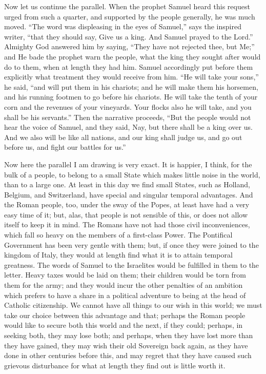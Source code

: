 Now let us continue the parallel. When the prophet
Samuel heard this request urged from such a quarter, and
supported by the people generally, he was much moved.
``The word was displeasing in the eyes of
Samuel,'' says the inspired writer, ``that they
should say, Give us a king. And Samuel prayed to the
Lord.'' Almighty God answered him by saying,
``They have not rejected thee, but Me;'' and He
bade the prophet warn the people, what the king they
sought after would do to them, when at length they had
him. Samuel accordingly put before them explicitly what
treatment they would receive from him. ``He will take
your sons,'' he said, ``and will put them in his
chariots; and he will make them his horsemen, and his
running footmen to go before his chariots. He will take
the tenth of your corn and the revenues of your
vineyards. Your flocks also he will take, and you shall
be his servants.'' Then the narrative proceeds,
``But the people would not hear the voice of Samuel,
and they said, Nay, but there shall be a king over us.
And we also will be like all nations, and our king shall
judge us, and go out before us, and fight our battles for
us.''

Now here the parallel I am drawing is very exact. It
is happier, I think, for the bulk of a people, to belong
to a small State which makes little noise in the world,
than to a large one. At least in this day we find small
States, such as Holland, Belgium, and Switzerland, have
special and singular temporal advantages. And the Roman
people, too, under the sway of the Popes, at least have
had a very easy time of it; but, alas, that people is not
sensible of this, or does not allow itself to keep it in
mind. The Romans have not had those civil inconveniences,
which fall so heavy on the members of a first-class
Power. The Pontifical Government has been very gentle
with them; but, if once they were joined to the kingdom
of Italy, they would at length find what it is to attain
temporal greatness. The words of Samuel to the Israelites
would be fulfilled in them to the letter. Heavy taxes
would be laid on them; their children would be torn from
them for the army; and they would incur the other
penalties of an ambition which prefers to have a share in
a political adventure to being at the head of Catholic
citizenship. We cannot have all things to our wish in
this world; we must take our choice between this
advantage and that; perhaps the Roman people would like
to secure both this world and the next, if they could;
perhaps, in seeking both, they may lose both; and
perhaps, when they have lost more than they have gained,
they may wish their old Sovereign back again, as they
have done in other centuries before this, and may regret
that they have caused such grievous disturbance for what
at length they find out is little worth it.

